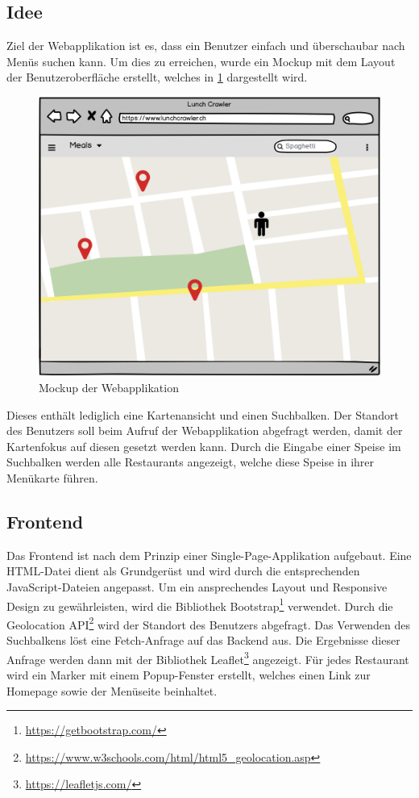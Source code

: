 \subsection{Idee}
Ziel der Webapplikation ist es, dass ein Benutzer einfach und überschaubar nach Menüs suchen kann.
Um dies zu erreichen, wurde ein Mockup mit dem Layout der Benutzeroberfläche erstellt, welches in \cref{fig:webapp_mockup} dargestellt wird.
\begin{figure}[H]
	\centering
	\includegraphics[width=0.7\columnwidth,keepaspectratio]{img/webapp_mockup.png}
	\caption{Mockup der Webapplikation}
	\label{fig:webapp_mockup}
\end{figure}
Dieses enthält lediglich eine Kartenansicht und einen Suchbalken.
Der Standort des Benutzers soll beim Aufruf der Webapplikation abgefragt werden, damit der Kartenfokus auf diesen gesetzt werden kann.
Durch die Eingabe einer Speise im Suchbalken werden alle Restaurants angezeigt, welche diese Speise in ihrer Menükarte führen.
\subsection{Frontend}
Das Frontend ist nach dem Prinzip einer Single-Page-Applikation aufgebaut.
Eine HTML-Datei dient als Grundgerüst und wird durch die entsprechenden JavaScript-Dateien angepasst.
Um ein ansprechendes Layout und Responsive Design zu gewährleisten, wird die Bibliothek \glqq Bootstrap\footnote{\url{https://getbootstrap.com/}}\grqq{} verwendet.
Durch die Geolocation API\footnote{\url{https://www.w3schools.com/html/html5_geolocation.asp}} wird der Standort des Benutzers abgefragt.
Das Verwenden des Suchbalkens löst eine Fetch-Anfrage auf das Backend aus.
Die Ergebnisse dieser Anfrage werden dann mit der Bibliothek \glqq Leaflet\footnote{\url{https://leafletjs.com/}}\grqq{} angezeigt.
Für jedes Restaurant wird ein Marker mit einem Popup-Fenster erstellt, welches einen Link zur Homepage sowie der Menüseite beinhaltet.
